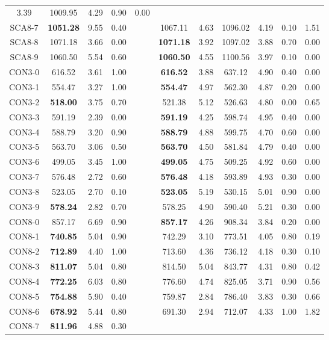 \begin{table}[h]
\begin{tabular*}{1.00\textwidth}{@{\extracolsep{\fill}} |c||c c c||c c c c c c c|}
3.39 & 1009.95 & 4.29 & 0.90 & 0.00\\SCA8-7 & \bf{1051.28} & 9.55 & 0.40 & & 
1067.11 & 4.63 & 1096.02 & 4.19 & 0.10 & 1.51\\SCA8-8 & 1071.18 & 3.66 & 0.00 & & \bf{1071.18} & 
3.92 & 1097.02 & 3.88 & 0.70 & 0.00\\SCA8-9 & 1060.50 & 5.54 & 0.60 & & \bf{1060.50} & 
4.55 & 1100.56 & 3.97 & 0.10 & 0.00\\CON3-0 & 616.52 & 3.61 & 1.00 & & \bf{616.52} & 
3.88 & 637.12 & 4.90 & 0.40 & 0.00\\CON3-1 & 554.47 & 3.27 & 1.00 & & \bf{554.47} & 
4.97 & 562.30 & 4.87 & 0.20 & 0.00\\CON3-2 & \bf{518.00} & 3.75 & 0.70 & & 
521.38 & 5.12 & 526.63 & 4.80 & 0.00 & 0.65\\CON3-3 & 591.19 & 2.39 & 0.00 & & \bf{591.19} & 
4.25 & 598.74 & 4.95 & 0.40 & 0.00\\CON3-4 & 588.79 & 3.20 & 0.90 & & \bf{588.79} & 
4.88 & 599.75 & 4.70 & 0.60 & 0.00\\CON3-5 & 563.70 & 3.06 & 0.50 & & \bf{563.70} & 
4.50 & 581.84 & 4.79 & 0.40 & 0.00\\CON3-6 & 499.05 & 3.45 & 1.00 & & \bf{499.05} & 
4.75 & 509.25 & 4.92 & 0.60 & 0.00\\CON3-7 & 576.48 & 2.72 & 0.60 & & \bf{576.48} & 
4.18 & 593.89 & 4.93 & 0.30 & 0.00\\CON3-8 & 523.05 & 2.70 & 0.10 & & \bf{523.05} & 
5.19 & 530.15 & 5.01 & 0.90 & 0.00\\CON3-9 & \bf{578.24} & 2.82 & 0.70 & & 
578.25 & 4.90 & 590.40 & 5.21 & 0.30 & 0.00\\CON8-0 & 857.17 & 6.69 & 0.90 & & \bf{857.17} & 
4.26 & 908.34 & 3.84 & 0.20 & 0.00\\CON8-1 & \bf{740.85} & 5.04 & 0.90 & & 
742.29 & 3.10 & 773.51 & 4.05 & 0.80 & 0.19\\CON8-2 & \bf{712.89} & 4.40 & 1.00 & & 
713.60 & 4.36 & 736.12 & 4.18 & 0.30 & 0.10\\CON8-3 & \bf{811.07} & 5.04 & 0.80 & & 
814.50 & 5.04 & 843.77 & 4.31 & 0.80 & 0.42\\CON8-4 & \bf{772.25} & 6.03 & 0.80 & & 
776.60 & 4.74 & 825.05 & 3.71 & 0.90 & 0.56\\CON8-5 & \bf{754.88} & 5.90 & 0.40 & & 
759.87 & 2.84 & 786.40 & 3.83 & 0.30 & 0.66\\CON8-6 & \bf{678.92} & 5.44 & 0.80 & & 
691.30 & 2.94 & 712.07 & 4.33 & 1.00 & 1.82\\CON8-7 & \bf{811.96} & 4.88 & 0.30 & & 

\end{tabular*}
\end{table}
